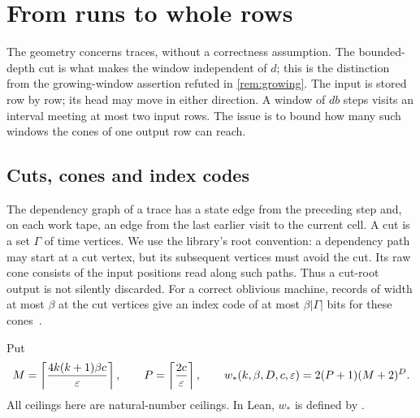 \section{From runs to whole rows}\label{sec:rows}

The geometry concerns traces, without a correctness assumption. The bounded-depth cut is what makes the window independent of $d$;
this is the distinction from the growing-window assertion refuted in \cref{rem:growing}. The input is stored row by row; its head may move
in either direction. A window of $db$ steps visits an interval meeting at most two input rows. The issue is to
bound how many such windows the cones of one output row can reach.

\subsection{Cuts, cones and index codes}\label{sec:rows-cones}

The dependency graph of a trace has a state edge from the preceding step and, on each work tape, an edge from the
last earlier visit to the current cell. A cut is a set $\Gamma$ of time vertices. We use the library's root
convention: a dependency path may start at a cut vertex, but its subsequent vertices must avoid the cut. Its raw
cone consists of the input positions read along such paths. Thus a cut-root output is not silently discarded.
For a correct oblivious machine, records of width at most $\beta$ at the cut vertices give an index code of at most
$\beta|\Gamma|$ bits for these cones~\cite[Corollary~4.5]{FourthPaper2026}.

Put
\[
 M=\left\lceil\frac{4k(k+1)\beta c}{\varepsilon}\right\rceil,\qquad
 P=\left\lceil\frac{2c}{\varepsilon}\right\rceil,\qquad
 w_*(k,\beta,D,c,\varepsilon)=2(P+1)(M+2)^D.
\]
All ceilings here are natural-number ceilings. In Lean, $w_*$ is defined by
.

